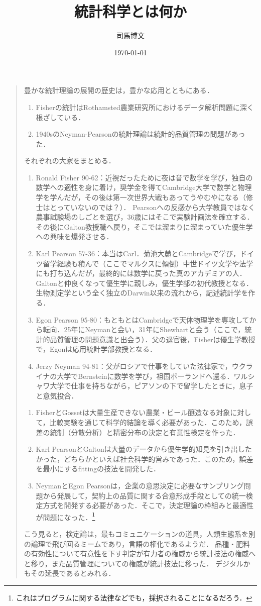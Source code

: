 \documentclass[uplatex,dvipdfmx]{jsreport}
\title{統計科学とは何か}
\author{司馬博文}
\date{\today}
\begin{document}
\tableofcontents

\begin{quotation}
    豊かな統計理論の展開の歴史は，豊かな応用とともにある．
    \begin{enumerate}
        \item Fisherの統計はRothamsted農業研究所におけるデータ解析問題に深く根ざしている．
        \item 1940sのNeyman-Pearsonの統計理論は統計的品質管理の問題があった．
    \end{enumerate}
    それぞれの大家をまとめる．
    \begin{enumerate}
        \item Ronald Fisher 90-62：近視だったために夜は音で数学を学び，独自の数学への適性を身に着け，奨学金を得てCambridge大学で数学と物理学を学んだが，その後は第一次世界大戦もあってうやむやになる（修士はとっていないのでは？）．
        Pearsonへの反感から大学教員ではなく農事試験場のしごとを選び，36歳にはそこで実験計画法を確立する．その後にGalton教授職へ戻り，そこでは溜まりに溜まっていた優生学への興味を爆発させる．
        \item Karl Pearson 57-36：本当はCarl．菊池大麓とCambridgeで学び，ドイツ留学経験も積んで（ここでマルクスに傾倒）中世ドイツ文学や法学にも打ち込んだが，最終的には数学に戻った真のアカデミアの人．Galtonと仲良くなって優生学に親しみ，優生学部の初代教授となる．生物測定学という全く独立のDarwin以来の流れから，記述統計学を作る．
        \item Egon Pearson 95-80：もともとはCambridgeで天体物理学を専攻してから転向．25年にNeymanと会い，31年にShewhartと会う（ここで，統計的品質管理の問題意識と出会う）．父の退官後，Fisherは優生学教授で，Egonは応用統計学部教授となる．
        \item Jerzy Neyman 94-81：父がロシアで仕事をしていた法律家で，ウクライナの大学でBernsteinに数学を学び，祖国ポーランドへ還る．ワルシャワ大学で仕事を持ちながら，ピアソンの下で留学したときに，息子と意気投合．
    \end{enumerate}
    \begin{enumerate}
        \item FisherとGossetは大量生産できない農業・ビール醸造なる対象に対して，比較実験を通じて科学的結論を導く必要があった．このため，誤差の統制（分散分析）と精密分布の決定と有意性検定を作った．
        \item Karl PearsonとGaltonは大量のデータから優生学的知見を引き出したかった，どちらかといえば社会科学的営みであった．このため，誤差を最小にするfittingの技法を開発した．
        \item NeymanとEgon Pearsonは，企業の意思決定に必要なサンプリング問題から発展して，契約上の品質に関する合意形成手段としての統一検定方式を開発する必要があった．そこで，決定理論の枠組みと最適性が問題になった．\footnote{これはプログラムに関する法律などでも，採択されることになるだろう．}
    \end{enumerate}
    こう見ると，検定論は，最もコミュニケーションの道具，人類生態系を別の論理で飛び回るミームであり，言語の権化であるようだ．
    品種・肥料の有効性について有意性を下す判定が有力者の権威から統計技法の権威へと移り，また品質管理についての権威が統計技法に移った．
    デジタルかもその延長であるとみれる．


\end{quotation}
\end{document}
